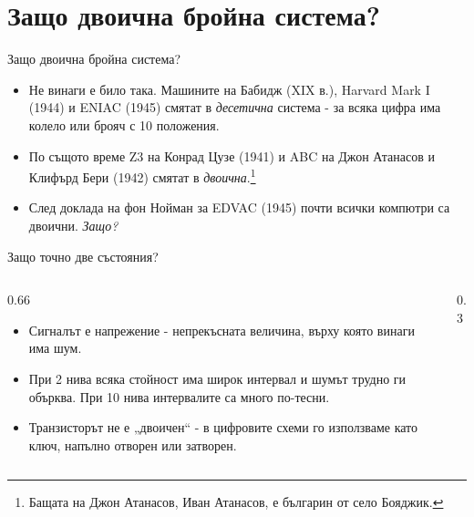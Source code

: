 \documentclass[14pt, aspectratio=169]{beamer}
\begin{document}
\section{Защо двоична бройна система?}

\begin{frame}{Защо двоична бройна система?}
  \begin{itemize}
    \item Не винаги е било така. Машините на Бабидж (XIX в.), Harvard Mark I
      (1944) и ENIAC (1945) смятат в \emph{десетична} система - за всяка цифра
      има колело или брояч с 10 положения.
    \item По същото време Z3 на Конрад Цузе (1941) и ABC на Джон Атанасов и
      Клифърд Бери (1942) смятат в \emph{двоична}.\footnote{Бащата на Джон
        Атанасов, Иван Атанасов, е българин от село Бояджик.}
    \item След доклада на фон Нойман за EDVAC (1945) почти всички компютри са
      двоични. \emph{Защо?}
  \end{itemize}
\end{frame}

\begin{frame}{Защо точно две състояния?}
  \begin{columns}[c]
    \begin{column}{0.66\textwidth}
      \begin{itemize}
        \item Сигналът е напрежение - непрекъсната величина, върху която
          винаги има шум.
        \item При 2 нива всяка стойност има широк интервал и шумът трудно ги
          обърква. При 10 нива интервалите са много по-тесни.
        \item Транзисторът не е „двоичен“ - в цифровите схеми го използваме
          като ключ, напълно отворен или затворен.
      \end{itemize}
    \end{column}
    \begin{column}{0.3\textwidth}
      \centering
    \end{column}
  \end{columns}
\end{frame}
\end{document}

